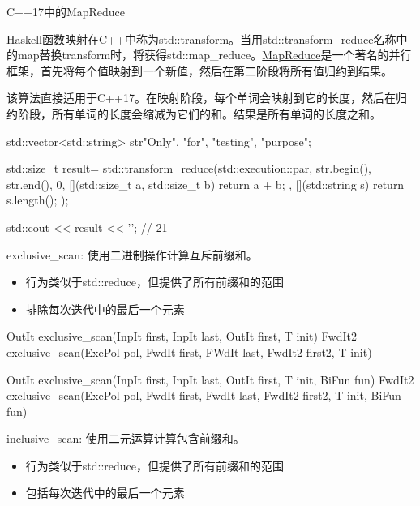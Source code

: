 \begin{myTip}{C++17中的MapReduce}

\href{https://www.haskell.org/}{Haskell}函数映射在C++中称为std::transform。当用std::transform\_reduce名称中的map替换transform时，将获得std::map\_reduce。\href{https://en.wikipedia.org/wiki/MapReduce}{MapReduce}是一个著名的并行框架，首先将每个值映射到一个新值，然后在第二阶段将所有值归约到结果。

该算法直接适用于C++17。在映射阶段，每个单词会映射到它的长度，然后在归约阶段，所有单词的长度会缩减为它们的和。结果是所有单词的长度之和。

\begin{cpp}
std::vector<std::string> str{"Only", "for", "testing", "purpose"};

std::size_t result= std::transform_reduce(std::execution::par,
				str.begin(), str.end(), 0,
				[](std::size_t a, std::size_t b){ return a + b; },
				[](std::string s){ return s.length(); });

std::cout << result << '\n'; // 21
\end{cpp}

\end{myTip}

exclusive\_scan: 使用二进制操作计算互斥前缀和。

\begin{itemize}
\item
行为类似于std::reduce，但提供了所有前缀和的范围

\item
排除每次迭代中的最后一个元素
\end{itemize}

\begin{cpp}
OutIt exclusive_scan(InpIt first, InpIt last, OutIt first, T init)
FwdIt2 exclusive_scan(ExePol pol, FwdIt first, FWdIt last,
					  FwdIt2 first2, T init)

OutIt exclusive_scan(InpIt first, InpIt last, OutIt first, T init, BiFun fun)
FwdIt2 exclusive_scan(ExePol pol, FwdIt first, FwdIt last,
					  FwdIt2 first2, T init, BiFun fun)
\end{cpp}

inclusive\_scan: 使用二元运算计算包含前缀和。

\begin{itemize}
\item
行为类似于std::reduce，但提供了所有前缀和的范围

\item
包括每次迭代中的最后一个元素
\end{itemize}

